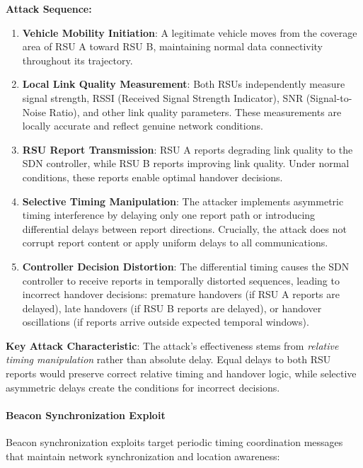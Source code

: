 \textbf{Attack Sequence:}
\begin{enumerate}
    \item \textbf{Vehicle Mobility Initiation}: A legitimate vehicle moves from the coverage area of RSU A toward RSU B, maintaining normal data connectivity throughout its trajectory.
    
    \item \textbf{Local Link Quality Measurement}: Both RSUs independently measure signal strength, RSSI (Received Signal Strength Indicator), SNR (Signal-to-Noise Ratio), and other link quality parameters. These measurements are locally accurate and reflect genuine network conditions.
    
    \item \textbf{RSU Report Transmission}: RSU A reports degrading link quality to the SDN controller, while RSU B reports improving link quality. Under normal conditions, these reports enable optimal handover decisions.
    
    \item \textbf{Selective Timing Manipulation}: The attacker implements asymmetric timing interference by delaying only one report path or introducing differential delays between report directions. Crucially, the attack does not corrupt report content or apply uniform delays to all communications.
    
    \item \textbf{Controller Decision Distortion}: The differential timing causes the SDN controller to receive reports in temporally distorted sequences, leading to incorrect handover decisions: premature handovers (if RSU A reports are delayed), late handovers (if RSU B reports are delayed), or handover oscillations (if reports arrive outside expected temporal windows).
\end{enumerate}

\textbf{Key Attack Characteristic}: The attack's effectiveness stems from \textit{relative timing manipulation} rather than absolute delay. Equal delays to both RSU reports would preserve correct relative timing and handover logic, while selective asymmetric delays create the conditions for incorrect decisions.

\paragraph{Beacon Synchronization Exploit}
Beacon synchronization exploits target periodic timing coordination messages that maintain network synchronization and location awareness:


